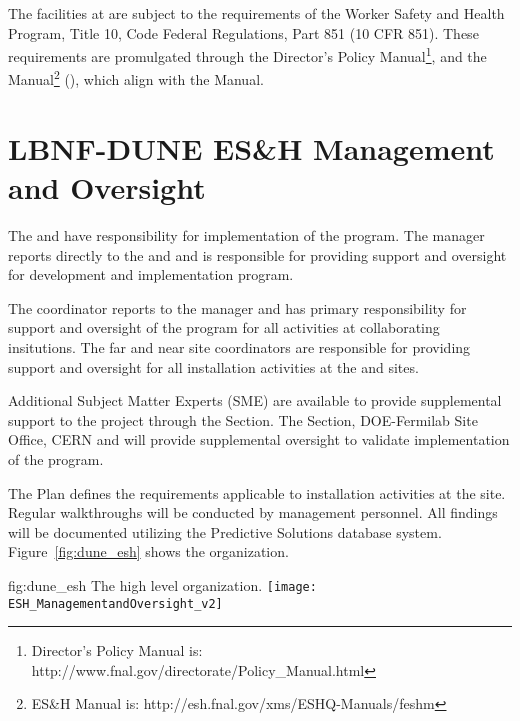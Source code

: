 The  facilities at  are subject to
the requirements of the  Worker Safety and Health Program,
Title 10, Code Federal Regulations, Part 851 (10 CFR 851). These
requirements are promulgated through the \fnal Director's Policy
Manual\footnote{\fnal Director's Policy Manual is:
  http://www.fnal.gov/directorate/Policy\_Manual.html}, and the \fnal
{} Manual\footnote{\fnal ES\&H Manual is:
  http://esh.fnal.gov/xms/ESHQ-Manuals/feshm} (), which
align with the   Manual.


\section{LBNF-DUNE ES\&H Management and Oversight}

The  and  have responsibility for
implementation of the   program.  The
  manager reports directly to the
 and  and is responsible for providing
 support and oversight for development and implementation
  program.

The   coordinator reports to the
  manager and has primary responsibility
for  support and oversight of the  
program for all activities at collaborating insitutions.  The far and
near site  coordinators are responsible for providing
support and oversight for all installation activities at the
 and sites.

Additional  Subject Matter Experts (SME) are available to provide
supplemental support to the project through the \fnal {}
Section. The \fnal {} Section, DOE-Fermilab Site Office, CERN and
 will provide supplemental  oversight to validate
implementation of the    program.

The   Plan defines the 
requirements applicable to installation activities at the 
site. Regular  walkthroughs will be conducted by
  management personnel. All
findings will be documented utilizing the \fnal Predictive Solutions
database system.
Figure~\ref{fig:dune_esh} shows the   organization.
\begin{dunefigure}{fig:dune_esh}
  {The high level   organization.}
  \texttt{[image: ESH\_ManagementandOversight\_v2]}
\end{dunefigure}

